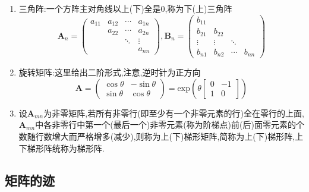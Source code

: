 {\begin{enumerate}[label=(\arabic*)]
\[                  a_{11},a_{22},\cdots,a_{nn}
                  \right\}
              \]
        \item 三角阵:一个方阵主对角线以上(下)全是$ 0$,称为下(上)三角阵\[
                  \bm{A}_n = \begin{pmatrix}
                      a_{11} & a_{12} & \cdots & a_{1n} \\
                             & a_{22} & \cdots & a_{2n} \\
                             &        & \ddots & \vdots \\
                             &        &        & a_{nn}
                  \end{pmatrix}
                  ,
                  \bm{B}_n = \begin{pmatrix}
                      b_{11} &        &        &        \\
                      b_{21} & b_{22} &        &        \\
                      \vdots & \vdots & \ddots &        \\
                      b_{n1} & b_{n2} & \cdots & b_{nn}
                  \end{pmatrix}
              \]
        \item 旋转矩阵:这里给出二阶形式,注意,逆时针为正方向\[
                  \bm{A} = \begin{pmatrix}
                      \cos \theta & -\sin\theta \\
                      \sin\theta  & \cos\theta
                  \end{pmatrix}
                  = \mathrm{exp}\left(
                  \theta \begin{bmatrix}
                          0 & -1 \\
                          1 & 0
                      \end{bmatrix}
                  \right)
              \]
        \item 设$\bm{A}_{mn}$为非零矩阵,若所有非零行(即至少有一个非零元素的行)全在零行的上面,$\bm{A}_{mn}$中各非零行中第一个(最后一个)非零元素(称为阶梯点)前(后)面零元素的个数随行数增大而严格增多(减少),则称为上(下)梯形矩阵,简称为上(下)梯形阵,上下梯形阵统称为梯形阵.
    \end{enumerate}
}
\subsection{矩阵的迹}
